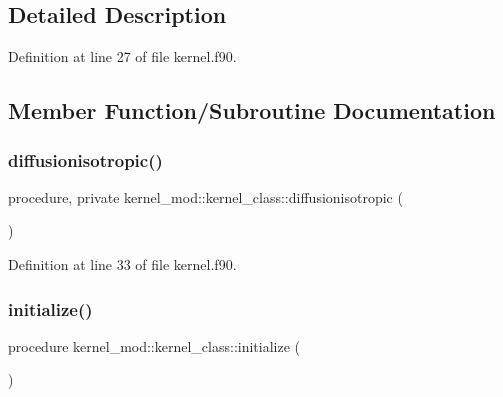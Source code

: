 \subsection{Detailed Description}


Definition at line 27 of file kernel.\+f90.



\subsection{Member Function/\+Subroutine Documentation}
\mbox{\label{structkernel__mod_1_1kernel__class_ade7a7d02085be709e7867735294e82a9}} 
\subsubsection{\texorpdfstring{diffusionisotropic()}{diffusionisotropic()}}
{\footnotesize\ttfamily procedure, private kernel\+\_\+mod\+::kernel\+\_\+class\+::diffusionisotropic (\begin{DoxyParamCaption}{ }\end{DoxyParamCaption})\hspace{0.3cm}{\ttfamily [private]}}



Definition at line 33 of file kernel.\+f90.

\mbox{\label{structkernel__mod_1_1kernel__class_a86a1de717f53f3276df28443b4495cc7}} 
\subsubsection{\texorpdfstring{initialize()}{initialize()}}
{\footnotesize\ttfamily procedure kernel\+\_\+mod\+::kernel\+\_\+class\+::initialize (\begin{DoxyParamCaption}{ }\end{DoxyParamCaption})}




